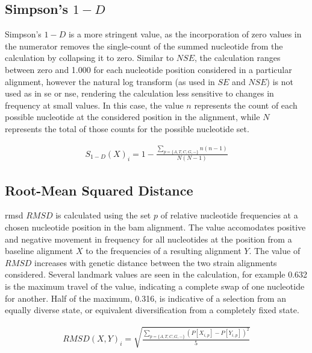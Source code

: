\subsection{Simpson's $1-D$}
Simpson's $1-D$ is a more stringent value, as the incorporation of zero values in the numerator removes the single-count of the summed nucleotide from the calculation by collapsing it to zero. Similar to $NSE$, the calculation ranges between zero and 1.000 for each nucleotide position considered in a particular alignment, however the natural log transform (as used in $SE$ and $NSE$) is not used as in \gls{se} or \gls{nse}, rendering the calculation less sensitive to changes in frequency at small values. In this case, the value $n$ represents the count of each possible nucleotide at the considered position in the alignment, while $N$ represents the total of those counts for the possible nucleotide set.
	
	\begin{align*}
		S_{1-D}(X)_{ i }=1-\frac{\sum\limits_{p=\{ A,T,C,G,-\}}^{  }n(n-1)}
		{N(N-1)}
	\end{align*}

\subsection{Root-Mean Squared Distance}
\Gls{rmsd} $RMSD$ is calculated using the set $p$ of relative nucleotide frequencies at a chosen nucleotide position in the \gls{bam} alignment. The value accomodates positive and negative movement in frequency for all nucleotides at the position from a baseline alignment $X$ to the frequencies of a resulting alignment $Y$. The value of $RMSD$ increases with genetic distance between the two strain alignments considered. Several landmark values are seen in the calculation, for example 0.632 is the maximum travel of the value, indicating a complete swap of one nucleotide for another.
Half of the maximum, 0.316, is indicative of a selection from an equally diverse state, or equivalent diversification from a completely fixed state.

	\begin{align*}
		RMSD(X, Y)_{ i }=\sqrt{\frac{\sum _{ p=\{ A,T,C,G,-\}  }^{  }{{(P[X_{ i,p }]-P[{ Y }_{ i,p }])}}^2}{5}}
	\end{align*}

